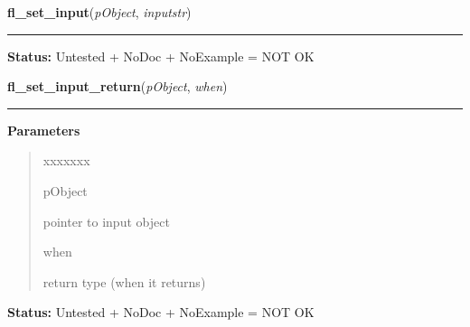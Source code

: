     \label{xformslib:library:fl_set_input}

    \vspace{0.5ex}

\hspace{.8\funcindent}\begin{boxedminipage}{\funcwidth}

    \raggedright \textbf{fl\_set\_input}(\textit{pObject}, \textit{inputstr})

    \vspace{-1.5ex}

    \rule{\textwidth}{0.5\fboxrule}
\setlength{\parskip}{2ex}
\setlength{\parskip}{1ex}
\textbf{Status:} Untested + NoDoc + NoExample = NOT OK



    \end{boxedminipage}

    \label{xformslib:library:fl_set_input_return}

    \vspace{0.5ex}

\hspace{.8\funcindent}\begin{boxedminipage}{\funcwidth}

    \raggedright \textbf{fl\_set\_input\_return}(\textit{pObject}, \textit{when})

    \vspace{-1.5ex}

    \rule{\textwidth}{0.5\fboxrule}
\setlength{\parskip}{2ex}
\setlength{\parskip}{1ex}
      \textbf{Parameters}
      \vspace{-1ex}

      \begin{quote}
        \begin{Ventry}{xxxxxxx}

          \item[pObject]

          pointer to input object

          \item[when]

          return type (when it returns)

        \end{Ventry}

      \end{quote}

\textbf{Status:} Untested + NoDoc + NoExample = NOT OK



    \end{boxedminipage}

